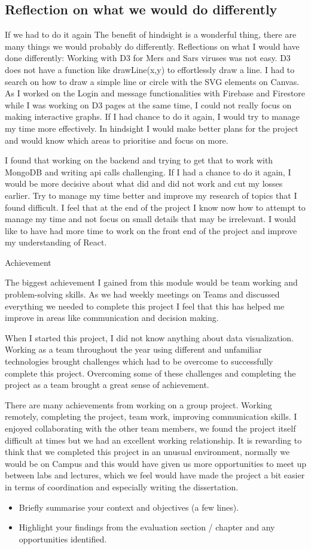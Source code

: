 \subsection{Reflection on what we would do differently}
If we had to do it again
The benefit of hindsight is a wonderful thing, there are many things we would probably do differently.
Reflections on what I would have done differently:
Working with D3 for Mers and Sars viruses was not easy. D3 does not have a function like drawLine(x,y) to effortlessly draw a line. I had to search on how to draw a simple line or circle with the SVG elements on Canvas. As I worked on the Login and message functionalities with Firebase and Firestore while I was working on D3 pages at the same time, I could not really focus on making interactive graphs.
If I had chance to do it again, I would try to manage my time more effectively. In hindsight I would make better plans for the project and would know which areas to prioritise and focus on more.

I found that working on the backend and trying to get that to work with MongoDB and writing api calls challenging. If I had a chance to do it again, I would be more decisive about what did and did not work and cut my losses earlier. Try to manage my time better and improve my research of topics that I found difficult. I feel that at the end of the project I know now how to attempt to manage my time and not focus on small details that may be irrelevant.
I would like to have had more time to work on the front end of the project and improve my understanding of React.




Achievement

The biggest achievement I gained from this module would be team working and problem-solving skills. As we had weekly meetings on Teams and discussed everything we needed to complete this project I feel that this has helped me improve in areas like communication and decision making.

When I started this project, I did not know anything about data visualization. Working as a team throughout the year using different and unfamiliar technologies brought challenges which had to be overcome to successfully complete this project. Overcoming some of these challenges and completing the project as a team brought a great sense of achievement.

There are many achievements from working on a group project. Working remotely, completing the project, team work, improving communication skills. I enjoyed collaborating with the other team members, we found the project itself difficult at times but we had an excellent working relationship. It is rewarding to think that we completed this project in an unusual environment, normally we would be on Campus and this would have given us more opportunities to meet up between labs and lectures, which we feel would have made the project a bit easier in terms of coordination and especially writing the dissertation.




\begin{itemize}
\item Briefly summarise your context and objectives (a few lines).
\item Highlight your findings from the evaluation section / chapter and any opportunities identified.
\end{itemize}



